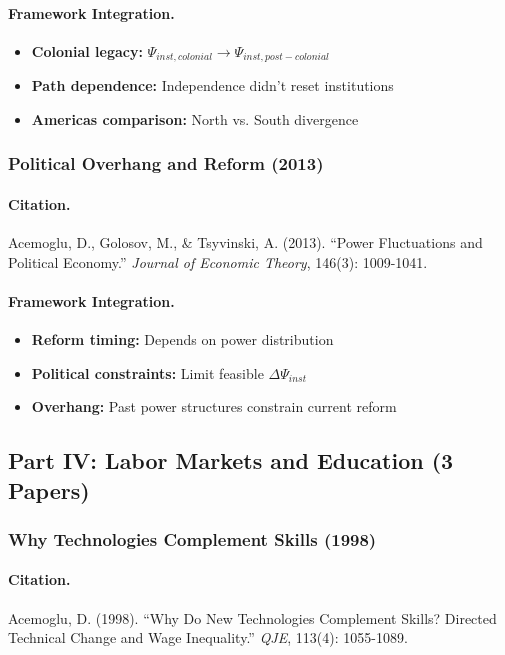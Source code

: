 \documentclass[12pt,a4paper]{article}
\begin{document}
\paragraph{Framework Integration.}
\begin{itemize}
  \item \textbf{Colonial legacy:} $\Psi_{inst,colonial} \to \Psi_{inst,post-colonial}$
  \item \textbf{Path dependence:} Independence didn't reset institutions
  \item \textbf{Americas comparison:} North vs. South divergence
\end{itemize}

\subsubsection{Political Overhang and Reform (2013)}

\paragraph{Citation.}
Acemoglu, D., Golosov, M., \& Tsyvinski, A. (2013).
``Power Fluctuations and Political Economy.''
\emph{Journal of Economic Theory}, 146(3): 1009-1041.

\paragraph{Framework Integration.}
\begin{itemize}
  \item \textbf{Reform timing:} Depends on power distribution
  \item \textbf{Political constraints:} Limit feasible $\Delta\Psi_{inst}$
  \item \textbf{Overhang:} Past power structures constrain current reform
\end{itemize}

\subsection{Part IV: Labor Markets and Education (3 Papers)}

\subsubsection{Why Technologies Complement Skills (1998)}

\paragraph{Citation.}
Acemoglu, D. (1998). ``Why Do New Technologies Complement Skills?
Directed Technical Change and Wage Inequality.'' \emph{QJE}, 113(4): 1055-1089.
\end{document}
